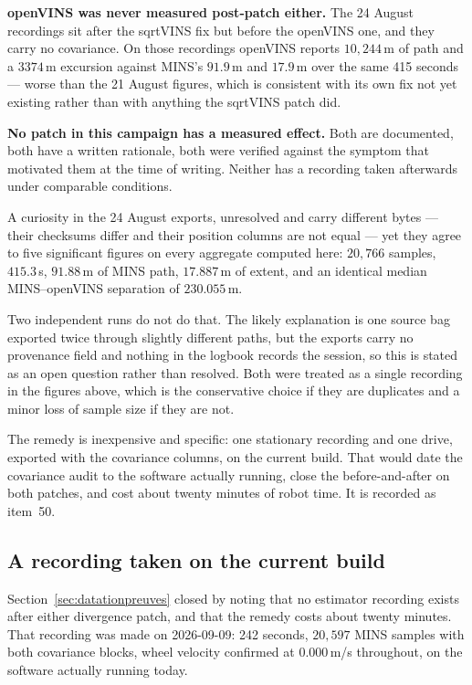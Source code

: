 \textbf{openVINS was never measured post-patch either.} The 24 August
recordings sit after the sqrtVINS fix but before the openVINS one, and
they carry no covariance. On those recordings openVINS reports $10{,}244$\,m
of path and a $3374$\,m excursion against MINS's $91.9$\,m and $17.9$\,m
over the same 415 seconds --- worse than the 21 August figures, which is
consistent with its own fix not yet existing rather than with anything the
sqrtVINS patch did.

\textbf{No patch in this campaign has a measured effect.} Both are
documented, both have a written rationale, both were verified against the
symptom that motivated them at the time of writing. Neither has a recording
taken afterwards under comparable conditions.

\begin{trapbox}{A curiosity in the 24 August exports, unresolved}
 and  carry
different bytes --- their checksums differ and their position columns are
not equal --- yet they agree to five significant figures on every aggregate
computed here: $20{,}766$ samples, $415.3$\,s, $91.88$\,m of MINS path,
$17.887$\,m of extent, and an identical median MINS--openVINS separation of
$230.055$\,m.

Two independent runs do not do that. The likely explanation is one source
bag exported twice through slightly different paths, but the exports carry
no provenance field and nothing in the logbook records the session, so this
is stated as an open question rather than resolved. Both were treated as a
single recording in the figures above, which is the conservative choice if
they are duplicates and a minor loss of sample size if they are not.
\end{trapbox}

\noindent The remedy is inexpensive and specific: one stationary recording
and one drive, exported with the covariance columns, on the current build.
That would date the covariance audit to the software actually running,
close the before-and-after on both patches, and cost about twenty minutes
of robot time. It is recorded as item~50.

\subsection{A recording taken on the current build}
\label{sec:mesureactuelle}

Section~\ref{sec:datationpreuves} closed by noting that no estimator
recording exists after either divergence patch, and that the remedy costs
about twenty minutes. That recording was made on 2026-09-09: 242 seconds,
$20{,}597$ MINS samples with both covariance blocks, wheel velocity
confirmed at $0.000$\,m/s throughout, on the software actually running
today.

